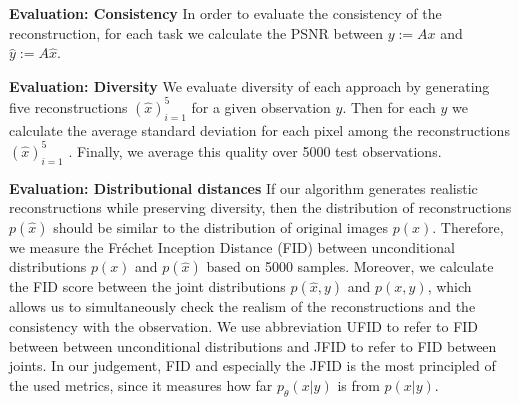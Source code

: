 \noindent
\textbf{Evaluation: Consistency}
In order to evaluate the consistency of the reconstruction, for each task we calculate the PSNR between $y:=Ax$ and $\hat{y}:=A\hat{x}$. 

\noindent
\textbf{Evaluation: Diversity}
We evaluate diversity of each approach by generating five reconstructions $(\hat{x})_{i=1}^5$ for a given observation ${y}$. Then for each $y$ we calculate the average standard deviation for each pixel among the reconstructions  $(\hat{x})_{i=1}^5$ . Finally, we average this quality over 5000 test observations.

\noindent
\textbf{Evaluation: Distributional distances}
If our algorithm generates realistic reconstructions while preserving diversity, then the distribution of reconstructions $p(\hat{x})$ should be similar to the distribution of original images $p(x)$. Therefore, we measure the Fr\'{e}chet Inception Distance (FID) \cite{heusel2018fid} between unconditional distributions $p(x)$ and $p(\hat{x})$ based on 5000 samples. Moreover, we calculate the FID score between the joint distributions $p(\hat{x}, y)$ and $p(x,y)$, which allows us to simultaneously check the realism of the reconstructions and the consistency with the observation. 
We use abbreviation UFID to refer to FID between between unconditional distributions and JFID to refer to FID between joints.  In our judgement, FID and especially the JFID is the most principled of the used metrics, since it measures how far $p_\theta(x | y)$ is from $p(x|y)$.

